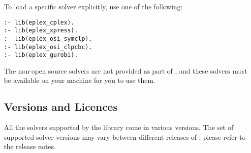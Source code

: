 To load a specific solver explicitly, use one of the following:

\begin{verbatim}
:- lib(eplex_cplex).
:- lib(eplex_xpress).
:- lib(eplex_osi_symclp). 
:- lib(eplex_osi_clpcbc). 
:- lib(eplex_gurobi).
\end{verbatim}
The non-open source solvers are not provided as part of \eclipse, and these
solvers must be available on your machine for you to use them.


\subsection{Versions and Licences}

All the solvers supported by the library come in various versions.
The set of supported solver versions may vary between different
releases of {\eclipse}; please refer to the release notes.

